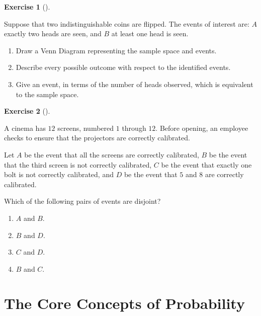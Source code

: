 \documentclass[
  letterpaper,
  DIV=11,
  numbers=noendperiod]{scrreprt}
\providecommand{\tightlist}{%
  \setlength{\itemsep}{0pt}\setlength{\parskip}{0pt}}\usepackage{longtable,booktabs,array}
\theoremstyle{definition}
\newtheorem{exercise}{Exercise}[chapter]
\theoremstyle{definition}
\theoremstyle{definition}
\theoremstyle{remark}
\begin{document}
\begin{exercise}[]\protect\hypertarget{exr-2.6}{}\label{exr-2.6}

Suppose that two indistinguishable coins are flipped. The events of
interest are: \(A\) exactly two heads are seen, and \(B\) at least one
head is seen.

\begin{enumerate}
\def\labelenumi{\alph{enumi}.}
\tightlist
\item
  Draw a Venn Diagram representing the sample space and events.
\item
  Describe every possible outcome with respect to the identified events.
\item
  Give an event, in terms of the number of heads observed, which is
  equivalent to the sample space.
\end{enumerate}

\end{exercise}

\begin{exercise}[]\protect\hypertarget{exr-2.7}{}\label{exr-2.7}

A cinema has \(12\) screens, numbered \(1\) through \(12\). Before
opening, an employee checks to ensure that the projectors are correctly
calibrated.

Let \(A\) be the event that all the screens are correctly calibrated,
\(B\) be the event that the third screen is not correctly calibrated,
\(C\) be the event that exactly one bolt is not correctly calibrated,
and \(D\) be the event that \(5\) and \(8\) are correctly calibrated.

Which of the following pairs of events are disjoint?

\begin{enumerate}
\def\labelenumi{\alph{enumi}.}
\tightlist
\item
  \(A\) and \(B\).
\item
  \(B\) and \(D\).
\item
  \(C\) and \(D\).
\item
  \(B\) and \(C\).
\end{enumerate}

\end{exercise}

\chapter{The Core Concepts of
Probability}\label{the-core-concepts-of-probability}
\end{document}
